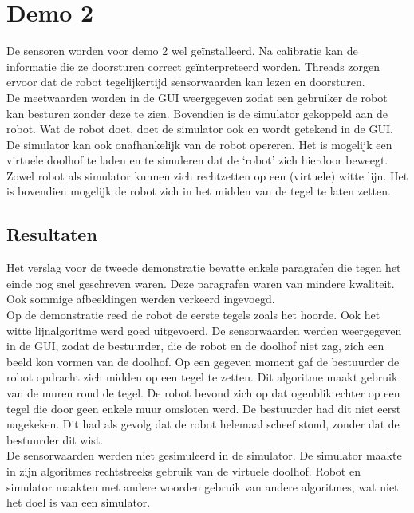 \documentclass[t1]{penoverslag}
\begin{document}
\section{Demo 2} %
\label{Asec:demo2}
De sensoren worden voor demo 2 wel ge\"installeerd. Na calibratie kan de informatie die ze doorsturen correct ge\"interpreteerd worden. Threads zorgen ervoor dat de robot tegelijkertijd sensorwaarden kan lezen en doorsturen.\\

De meetwaarden worden in de GUI weergegeven zodat een gebruiker de robot kan besturen zonder deze te zien. Bovendien is de simulator gekoppeld aan de robot. Wat de robot doet, doet de simulator ook en wordt getekend in de GUI. De simulator kan ook onafhankelijk van de robot opereren. Het is mogelijk een virtuele doolhof te laden en te simuleren dat de `robot' zich hierdoor beweegt. Zowel robot als simulator kunnen zich rechtzetten op een (virtuele) witte lijn. Het is bovendien mogelijk de robot zich in het midden van de tegel te laten zetten.


\subsection{Resultaten} %
\label{Assec:result2}
Het verslag voor de tweede demonstratie bevatte enkele paragrafen die tegen het einde nog snel geschreven waren. Deze paragrafen waren van mindere kwaliteit. Ook sommige afbeeldingen werden verkeerd ingevoegd.\\

Op de demonstratie reed de robot de eerste tegels zoals het hoorde. Ook het witte lijnalgoritme werd goed uitgevoerd. De sensorwaarden werden weergegeven in de GUI, zodat de bestuurder, die de robot en de doolhof niet zag, zich een beeld kon vormen van de doolhof. Op een gegeven moment gaf de bestuurder de robot opdracht zich midden op een tegel te zetten. Dit algoritme maakt gebruik van de muren rond de tegel. De robot bevond zich op dat ogenblik echter op een tegel die door geen enkele muur omsloten werd. De bestuurder had dit niet eerst nagekeken. Dit had als gevolg dat de robot helemaal scheef stond, zonder dat de bestuurder dit wist.\\

De sensorwaarden werden niet gesimuleerd in de simulator. De simulator maakte in zijn algoritmes rechtstreeks gebruik van de virtuele doolhof. Robot en simulator maakten met andere woorden gebruik van andere algoritmes, wat niet het doel is van een simulator.\\
\end{document}
